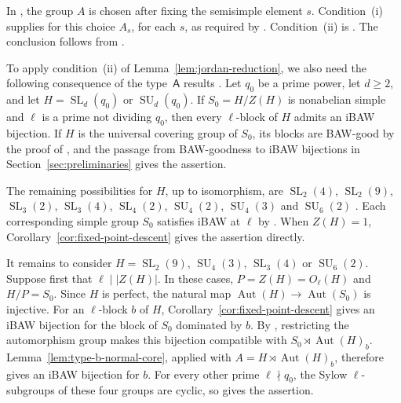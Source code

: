 \documentclass[10pt]{amsart}
\theoremstyle{definition}
\renewcommand{\geq}{\geqslant}
\let\oldendproof\endproof
\renewenvironment{proof}[1][\proofname]{%
  \oldproof[\bfseries #1]%
}{\oldendproof}
\DeclareMathOperator{\Aut}{Aut}
\numberwithin{equation}{section}
\numberwithin{table}{section}
\begin{document}
\begin{proof}
In \cite[Section~5]{FengLiZhang2022Jordan}, the group $A$ is chosen after
fixing the semisimple element $s$. Condition~\textup{(i)} supplies
\cite[Assumption~5.3]{FengLiZhang2022Jordan} for this choice $A_s$, for
each $s$, as required by \cite[Hypothesis~5.5(a)]{FengLiZhang2022Jordan}.
Condition~\textup{(ii)} is \cite[Hypothesis~5.5(b)]{FengLiZhang2022Jordan}.
The conclusion follows from \cite[Theorem~5.7]{FengLiZhang2022Jordan}.
\end{proof}

To apply condition~\textup{(ii)} of Lemma~\ref{lem:jordan-reduction},
we also need the following consequence of the type~$\mathsf A$ results
\cite{FengLiZhang2023LowRankA,FengLiZhang2023Morita}.
Let $q_0$ be a prime power, let $d\geq2$, and let
$H=\operatorname{SL}_d(q_0)$ or $\operatorname{SU}_d(q_0)$.
If $S_0=H/Z(H)$ is nonabelian simple and $\ell$ is a prime not
dividing $q_0$, then every $\ell$-block of $H$ admits an iBAW bijection.
If $H$ is the universal covering group of $S_0$, its blocks are
BAW-good by the proof of \cite[Theorem~1]{FengLiZhang2023Morita},
and the passage from BAW-goodness to iBAW bijections in
Section~\ref{sec:preliminaries} gives the assertion.

The remaining possibilities for $H$, up to isomorphism, are
$\operatorname{SL}_2(4)$, $\operatorname{SL}_2(9)$,
$\operatorname{SL}_3(2)$, $\operatorname{SL}_3(4)$,
$\operatorname{SL}_4(2)$, $\operatorname{SU}_4(2)$,
$\operatorname{SU}_4(3)$ and $\operatorname{SU}_6(2)$
\cite[Remark~24.19 and Table~24.3]{MalleTesterman2011}.
Each corresponding simple group $S_0$ satisfies iBAW at $\ell$ by
\cite[Proposition~4.6]{FengLiZhang2023LowRankA}.
When $Z(H)=1$, Corollary~\ref{cor:fixed-point-descent} gives the
assertion directly.

It remains to consider $H=\operatorname{SL}_2(9)$,
$\operatorname{SU}_4(3)$, $\operatorname{SL}_3(4)$ or
$\operatorname{SU}_6(2)$. Suppose first that $\ell\mid|Z(H)|$.
In these cases, $P=Z(H)=O_\ell(H)$ and $H/P=S_0$.
Since $H$ is perfect, the natural map
$\Aut(H)\longrightarrow\Aut(S_0)$ is injective.
For an $\ell$-block $b$ of $H$,
Corollary~\ref{cor:fixed-point-descent} gives an iBAW bijection for
the block of $S_0$ dominated by $b$.
By \cite[Lemma~3.6(i)]{MartinezRizoRossi2026}, restricting the
automorphism group makes this bijection compatible with
$S_0\rtimes\Aut(H)_b$.
Lemma~\ref{lem:type-b-normal-core}, applied with
$A=H\rtimes\Aut(H)_b$, therefore gives an iBAW bijection for $b$.
For every other prime $\ell\nmid q_0$, the Sylow $\ell$-subgroups
of these four groups are cyclic, so
\cite[Proposition~8.5]{MartinezRizoRossi2026} gives the assertion.
\end{document}
